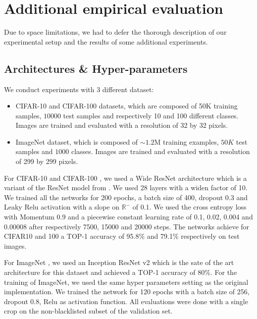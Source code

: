 \section{Additional empirical evaluation}

Due to space limitations, we had to defer the thorough description of our experimental setup and the results of some additional experiments.

\subsection{Architectures \& Hyper-parameters}

We conduct experiments with 3 different dataset:
\begin{itemize}
    \item CIFAR-10 and CIFAR-100 datasets, which are composed of 50K training samples, $10000$ test samples and respectively 10 and 100 different classes. Images are trained and evaluated with a resolution of 32 by 32 pixels. 
    \item ImageNet dataset, which is composed of $\sim1.2$M training examples, $50K$ test samples and $1000$ classes. Images are trained and evaluated with a resolution of 299 by 299 pixels. 
\end{itemize}

For CIFAR-10 and CIFAR-100 \cite{krizhevsky2009learning}, we used a Wide ResNet architecture \cite{ZagoruykoK16} which is a variant of the ResNet model from \cite{He_2016_CVPR}.
We used 28 layers with a widen factor of 10.
We trained all the networks for 200 epochs, a batch size of 400, dropout 0.3 and Leaky Relu activation with a slope on $\mathbb{R}^-$ of 0.1. We used the cross entropy loss with Momentum 0.9 and  a piecewise constant learning rate of 0.1, 0.02, 0.004 and 0.00008 after respectively 7500, 15000 and 20000 steps.
The networks achieve for CIFAR10 and 100 a TOP-1 accuracy of 95.8\% and 79.1\% respectively on test images. 

For ImageNet \cite{imagenet_cvpr09}, we used an Inception ResNet v2 \cite{szegedy2017inception} which is the sate of the art architecture for this dataset and achieved a TOP-1 accuracy of 80\%.
For the training of ImageNet, we used the same hyper parameters setting as the original implementation.
We trained the network for 120 epochs with a batch size of 256, dropout 0.8, Relu as activation function.
All evaluations were done with a single crop on the non-blacklisted subset of the validation set.


